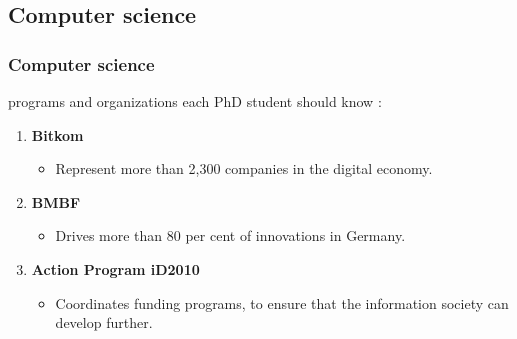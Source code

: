 \documentclass[9pt, compress]{beamer}
\begin{document}
	\subsection{Computer science} 
	\begin{frame} 
		\frametitle{Computer science}
		programs and organizations  each PhD student should know :
		\begin{enumerate}
			\setcounter{enumi}{0}
			\item \textbf{Bitkom}
			\begin{itemize}
				\item  Represent more than 2,300 companies in the digital economy.
			\end{itemize}
			\item \textbf{BMBF} 
			\begin{itemize}
				\item Drives more than 80 per cent of innovations in Germany.
			\end{itemize}
			\item \textbf{Action Program iD2010}
			\begin{itemize}
				\item Coordinates funding programs, to ensure that the information society can develop further.
			\end{itemize}
		\end{enumerate}
	\end{frame}
\end{document}

